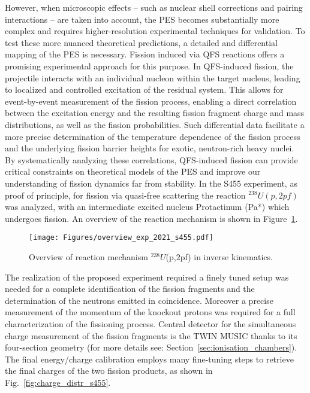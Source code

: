 However, when microscopic effects -- such as nuclear shell corrections and pairing interactions -- are taken into account, the PES becomes substantially more complex and requires higher-resolution experimental techniques for validation.\newline
To test these more nuanced theoretical predictions, a detailed and differential mapping of the PES is necessary. Fission induced via QFS reactions offers a promising experimental approach for this purpose. In QFS-induced fission, the projectile interacts with an individual nucleon within the target nucleus, leading to localized and controlled excitation of the residual system. This allows for event-by-event measurement of the fission process, enabling a direct correlation between the excitation energy and the resulting fission fragment charge and mass distributions, as well as the fission probabilities.\newline
Such differential data facilitate a more precise determination of the temperature dependence of the fission process and the underlying fission barrier heights for exotic, neutron-rich heavy nuclei. By systematically analyzing these correlations, QFS-induced fission can provide critical constraints on theoretical models of the PES and improve our understanding of fission dynamics far from stability.\newline
In the S455 experiment, as proof of principle, for fission via quasi-free scattering the reaction $^{238}U(p,2pf)$ was analyzed, with an intermediate excited nucleus Protactinum (Pa*) which undergoes fission. An overview of the reaction mechanism is shown in Figure~\ref{fig:drop_shell_model}.\newline 
\begin{figure}[htpb]
    \centering
    \texttt{[image: Figures/overview\_exp\_2021\_s455.pdf]}
    \caption{
    Overview of reaction mechanism $^{238}U$(p,2pf) in inverse kinematics.
    }
    \label{fig:drop_shell_model}
\end{figure}
The realization of the proposed experiment required a finely tuned  setup was needed for a complete identification of the fission fragments and the determination of the neutrons emitted in coincidence. Moreover a  precise measurement of the momentum of the knockout protons was required for a full characterization of the fissioning process.\newline
Central detector for the simultaneous charge measurement of the fission fragments is the TWIN MUSIC thanks to its four-section geometry (for more details see: Section~\ref{sec:ionisation_chambers}). The final energy/charge calibration employs many fine-tuning steps to retrieve the final charges of the two fission products, as shown in Fig.~\ref{fig:charge_distr_s455}. 

